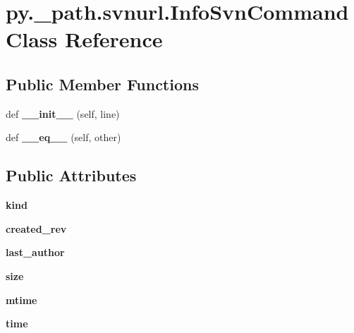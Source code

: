 \hypertarget{classpy_1_1__path_1_1svnurl_1_1_info_svn_command}{}\section{py.\+\_\+path.\+svnurl.\+Info\+Svn\+Command Class Reference}
\label{classpy_1_1__path_1_1svnurl_1_1_info_svn_command}
\subsection*{Public Member Functions}
\begin{DoxyCompactItemize}
\item 
\mbox{\label{classpy_1_1__path_1_1svnurl_1_1_info_svn_command_aa761a502bae5ba143f0c5370814fee57}} 
def {\bfseries \+\_\+\+\_\+init\+\_\+\+\_\+} (self, line)
\item 
\mbox{\label{classpy_1_1__path_1_1svnurl_1_1_info_svn_command_af6aa9506d6d35f17db465b1d3cdd811e}} 
def {\bfseries \+\_\+\+\_\+eq\+\_\+\+\_\+} (self, other)
\end{DoxyCompactItemize}
\subsection*{Public Attributes}
\begin{DoxyCompactItemize}
\item 
\mbox{\label{classpy_1_1__path_1_1svnurl_1_1_info_svn_command_a3565f0e352c912769268f6f6e8844b4f}} 
{\bfseries kind}
\item 
\mbox{\label{classpy_1_1__path_1_1svnurl_1_1_info_svn_command_a92641345c9fd86db889418e503296b0a}} 
{\bfseries created\+\_\+rev}
\item 
\mbox{\label{classpy_1_1__path_1_1svnurl_1_1_info_svn_command_ad97f2d27681666a04a17028dc57de59e}} 
{\bfseries last\+\_\+author}
\item 
\mbox{\label{classpy_1_1__path_1_1svnurl_1_1_info_svn_command_ae8c82c66e91795c702fc002361d94801}} 
{\bfseries size}
\item 
\mbox{\label{classpy_1_1__path_1_1svnurl_1_1_info_svn_command_a34c306ce91ddd505d25e79239a38c153}} 
{\bfseries mtime}
\item 
\mbox{\label{classpy_1_1__path_1_1svnurl_1_1_info_svn_command_ab514a3f343c9a5950689c74cde35dc23}} 
{\bfseries time}
\end{DoxyCompactItemize}
